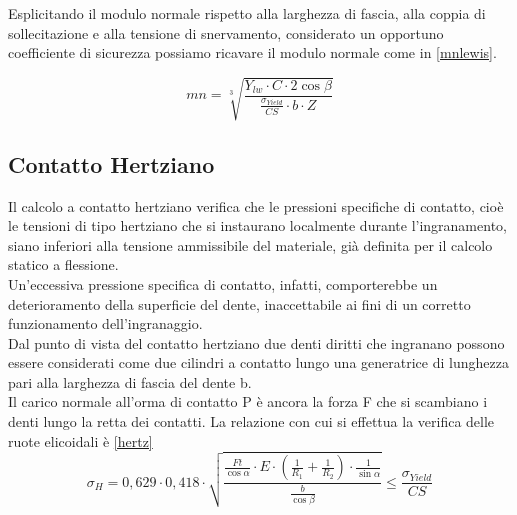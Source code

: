 \documentclass[%
corpo=11pt,
twoside,
 stile=classica,
oldstyle,
greek,%
]{toptesi}
\begin{document}
	Esplicitando il modulo normale rispetto alla larghezza di fascia, alla coppia di sollecitazione e alla tensione di snervamento, considerato un opportuno coefficiente di sicurezza possiamo ricavare il modulo normale come in \ref{mnlewis}.
	
		\begin{equation}\label{mnlewis}
	mn=\sqrt[3]{\frac{Y_{lw} \cdot C \cdot 2 \cos\beta}{\frac{\sigma_{Yield}}{CS} \cdot b \cdot Z}}
	\end{equation}
	
	\subsection{Contatto Hertziano}
	Il calcolo a contatto hertziano verifica che le pressioni specifiche di contatto, cioè le tensioni di tipo hertziano che si instaurano localmente durante l’ingranamento, siano inferiori alla tensione ammissibile del materiale, già definita per il calcolo statico a flessione.\\
	Un’eccessiva pressione specifica di contatto, infatti, comporterebbe un deterioramento della superficie del dente, inaccettabile ai fini di un corretto funzionamento dell’ingranaggio.\\
	Dal punto di vista del contatto hertziano due denti diritti che ingranano possono essere considerati come due cilindri a contatto lungo una generatrice di lunghezza pari alla larghezza di fascia del dente b. \\
	Il carico normale all’orma di contatto P è ancora la forza F che si scambiano i denti lungo la retta dei contatti. 
		La relazione con cui si effettua la verifica delle ruote elicoidali è \ref{hertz}
	\begin{equation}\label{hertz}
	\sigma_{H}=0,629\cdot0,418\cdot\sqrt{\frac{\frac{Ft}{\cos\alpha}\cdot E\cdot(\frac{1}{R_{1}}+\frac{1}{R_{2}})\cdot \frac{1}{\sin\alpha}}{\frac{b}{\cos\beta}}}\leq \frac{\sigma_{Yield}}{CS}
	\end{equation}
	

	
\end{document}
